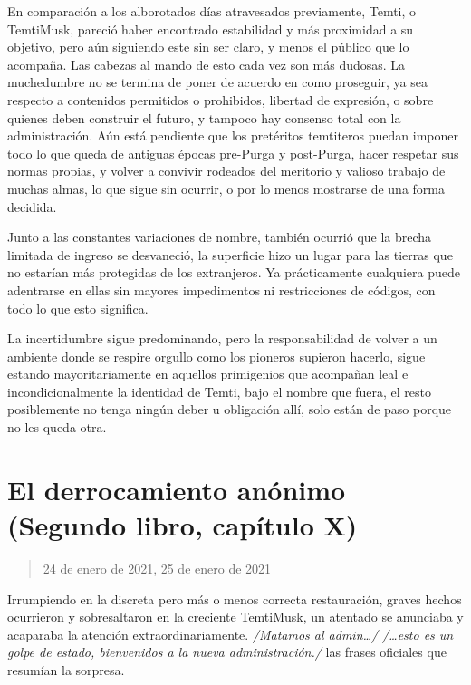 \documentclass[
]{book}
\begin{document}
En comparación a los alborotados días atravesados previamente, Temti, o TemtiMusk, pareció haber encontrado estabilidad y más proximidad a su objetivo, pero aún siguiendo este sin ser claro, y menos el público que lo acompaña. Las cabezas al mando de esto cada vez son más dudosas. La muchedumbre no se termina de poner de acuerdo en como proseguir, ya sea respecto a contenidos permitidos o prohibidos, libertad de expresión, o sobre quienes deben construir el futuro, y tampoco hay consenso total con la administración. Aún está pendiente que los pretéritos temtiteros puedan imponer todo lo que queda de antiguas épocas pre-Purga y post-Purga, hacer respetar sus normas propias, y volver a convivir rodeados del meritorio y valioso trabajo de muchas almas, lo que sigue sin ocurrir, o por lo menos mostrarse de una forma decidida.

Junto a las constantes variaciones de nombre, también ocurrió que la brecha limitada de ingreso se desvaneció, la superficie hizo un lugar para las tierras que no estarían más protegidas de los extranjeros. Ya prácticamente cualquiera puede adentrarse en ellas sin mayores impedimentos ni restricciones de códigos, con todo lo que esto significa.

La incertidumbre sigue predominando, pero la responsabilidad de volver a un ambiente donde se respire orgullo como los pioneros supieron hacerlo, sigue estando mayoritariamente en aquellos primigenios que acompañan leal e incondicionalmente la identidad de Temti, bajo el nombre que fuera, el resto posiblemente no tenga ningún deber u obligación allí, solo están de paso porque no les queda otra.

\hypertarget{el-derrocamiento-anuxf3nimo-segundo-libro-capuxedtulo-x}{%
\section{El derrocamiento anónimo (Segundo libro, capítulo X)}\label{el-derrocamiento-anuxf3nimo-segundo-libro-capuxedtulo-x}}

\begin{quote}
24 de enero de 2021, 25 de enero de 2021
\end{quote}

Irrumpiendo en la discreta pero más o menos correcta restauración, graves hechos ocurrieron y sobresaltaron en la creciente TemtiMusk, un atentado se anunciaba y acaparaba la atención extraordinariamente. \emph{/Matamos al admin\ldots/} \emph{/\ldots esto es un golpe de estado, bienvenidos a la nueva administración./} las frases oficiales que resumían la sorpresa.
\end{document}
